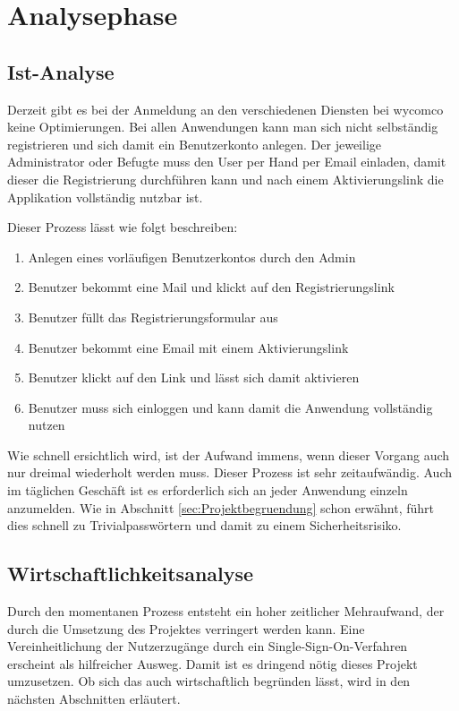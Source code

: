 \section{Analysephase} 
\label{sec:Analysephase}


\subsection{Ist-Analyse} 
\label{sec:IstAnalyse}

Derzeit gibt es bei der Anmeldung an den verschiedenen Diensten bei wycomco keine Optimierungen. 
Bei allen Anwendungen kann man sich nicht selbständig registrieren und sich damit ein Benutzerkonto anlegen. Der jeweilige Administrator oder Befugte muss den User per Hand per Email einladen, damit dieser die Registrierung durchführen kann und nach einem Aktivierungslink die Applikation vollständig nutzbar ist. 

Dieser Prozess lässt wie folgt beschreiben:
\begin{enumerate}
	\item Anlegen eines vorläufigen Benutzerkontos durch den Admin
	\item Benutzer bekommt eine Mail und klickt auf den Registrierungslink
	\item Benutzer füllt das Registrierungsformular aus
	\item Benutzer bekommt eine Email mit einem Aktivierungslink
	\item Benutzer klickt auf den Link und lässt sich damit aktivieren
	\item Benutzer muss sich einloggen und kann damit die Anwendung vollständig nutzen
\end{enumerate}

Wie schnell ersichtlich wird, ist der Aufwand immens, wenn dieser Vorgang auch nur dreimal wiederholt werden muss.
Dieser Prozess ist sehr zeitaufwändig. Auch im täglichen Geschäft ist es erforderlich sich an jeder Anwendung einzeln anzumelden. Wie in Abschnitt \ref{sec:Projektbegruendung} schon erwähnt, führt dies schnell zu Trivialpasswörtern und damit zu einem Sicherheitsrisiko. 


\subsection{Wirtschaftlichkeitsanalyse}
\label{sec:Wirtschaftlichkeitsanalyse}

Durch den momentanen Prozess entsteht ein hoher zeitlicher Mehraufwand, der durch die Umsetzung des Projektes verringert werden kann.
Eine Vereinheitlichung der Nutzerzugänge durch ein Single-Sign-On-Verfahren erscheint als hilfreicher Ausweg.
Damit ist es dringend nötig dieses Projekt umzusetzen. Ob sich das auch wirtschaftlich begründen lässt, wird in den nächsten Abschnitten erläutert.


